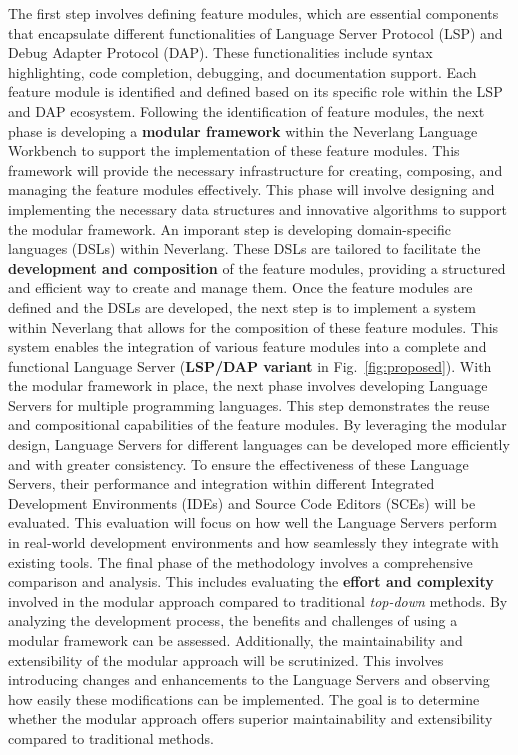 The first step involves defining feature modules, which are essential components that encapsulate different functionalities of Language Server Protocol (LSP) and Debug Adapter Protocol (DAP). These functionalities include syntax highlighting, code completion, debugging, and documentation support. Each feature module is identified and defined based on its specific role within the LSP and DAP ecosystem. Following the identification of feature modules, the next phase is developing a \textbf{modular framework} within the Neverlang Language Workbench to support the implementation of these feature modules. This framework will provide the necessary infrastructure for creating, composing, and managing the feature modules effectively. This phase will involve designing and implementing the necessary data structures and innovative algorithms to support the modular framework.
An imporant step is developing domain-specific languages (DSLs) within Neverlang. These DSLs are tailored to facilitate the \textbf{development and composition} of the feature modules, providing a structured and efficient way to create and manage them. Once the feature modules are defined and the DSLs are developed, the next step is to implement a system within Neverlang that allows for the composition of these feature modules. This system enables the integration of various feature modules into a complete and functional Language Server (\textbf{LSP/DAP variant} in Fig.~\ref{fig:proposed}). With the modular framework in place, the next phase involves developing Language Servers for multiple programming languages. This step demonstrates the reuse and compositional capabilities of the feature modules. By leveraging the modular design, Language Servers for different languages can be developed more efficiently and with greater consistency. To ensure the effectiveness of these Language Servers, their performance and integration within different Integrated Development Environments (IDEs) and Source Code Editors (SCEs) will be evaluated. This evaluation will focus on how well the Language Servers perform in real-world development environments and how seamlessly they integrate with existing tools. The final phase of the methodology involves a comprehensive comparison and analysis. This includes evaluating the \textbf{effort and complexity} involved in the modular approach compared to traditional \textit{top-down} methods. By analyzing the development process, the benefits and challenges of using a modular framework can be assessed. Additionally, the maintainability and extensibility of the modular approach will be scrutinized. This involves introducing changes and enhancements to the Language Servers and observing how easily these modifications can be implemented. The goal is to determine whether the modular approach offers superior maintainability and extensibility compared to traditional methods.

